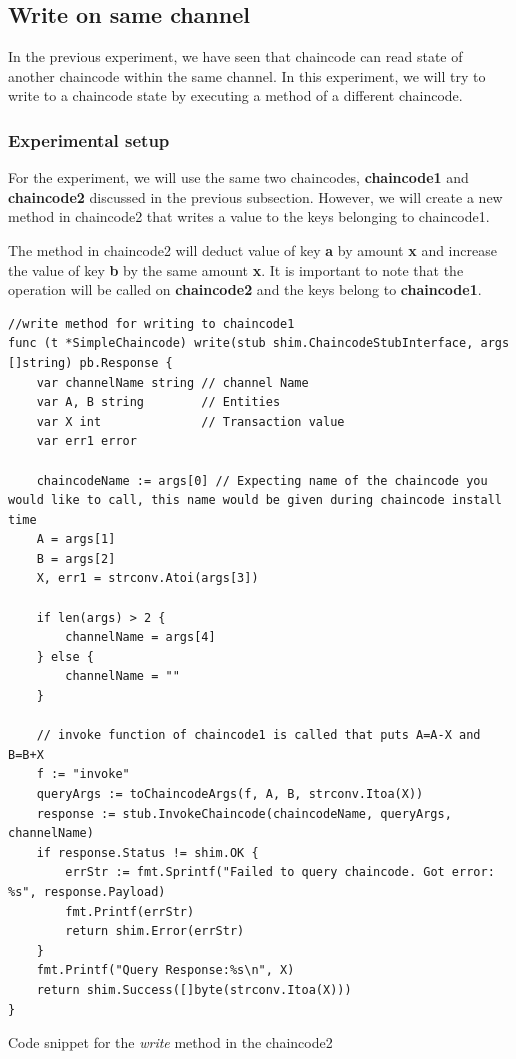 \documentclass[
  a4paper,  %
  twoside,  %
  bibliography=totoc,
  headsepline,
  cleardoublepage=empty,
  parskip=half,
  draft=false
]{scrbook}
\begin{document}
\subsection{Write on same channel}
In the previous experiment, we have seen that chaincode can read state of another chaincode within the same channel. In this experiment, we will try to write to a chaincode state by executing a method of a different chaincode.

\subsubsection{Experimental setup}
For the experiment, we will use the same two chaincodes, \textbf{chaincode1} and \textbf{chaincode2} discussed in the previous subsection. However, we will create a new method in chaincode2 that writes a value to the keys belonging to chaincode1.

The method in chaincode2 will deduct value of key \textbf{a} by amount \textbf{x} and increase the value of key \textbf{b} by the same amount \textbf{x}. It is important to note that the operation will be called on \textbf{chaincode2} and the keys belong to \textbf{chaincode1}.
\begin{Listing}[h!]
\begin{lstlisting}
//write method for writing to chaincode1
func (t *SimpleChaincode) write(stub shim.ChaincodeStubInterface, args []string) pb.Response {
	var channelName string // channel Name
	var A, B string        // Entities
	var X int              // Transaction value
	var err1 error

	chaincodeName := args[0] // Expecting name of the chaincode you would like to call, this name would be given during chaincode install time
	A = args[1]
	B = args[2]
	X, err1 = strconv.Atoi(args[3])

	if len(args) > 2 {
		channelName = args[4]
	} else {
		channelName = ""
	}

	// invoke function of chaincode1 is called that puts A=A-X and B=B+X
	f := "invoke"
	queryArgs := toChaincodeArgs(f, A, B, strconv.Itoa(X))
	response := stub.InvokeChaincode(chaincodeName, queryArgs, channelName)
	if response.Status != shim.OK {
		errStr := fmt.Sprintf("Failed to query chaincode. Got error: %s", response.Payload)
		fmt.Printf(errStr)
		return shim.Error(errStr)
	}
	fmt.Printf("Query Response:%s\n", X)
	return shim.Success([]byte(strconv.Itoa(X)))
}
\end{lstlisting}
\caption{Code snippet for the \textit{write} method in the chaincode2}
\label{lst:cw}
\end{Listing}
\end{document}

